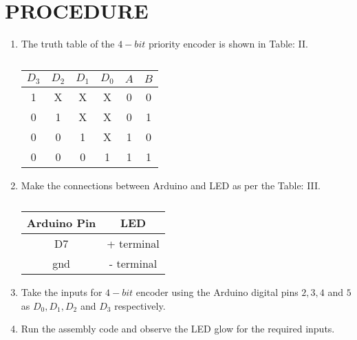 \documentclass[conference]{IEEEtran}
\begin{document}
\section{PROCEDURE}
\begin {enumerate}
\item The truth table of the $4-bit$ priority encoder is shown in Table: II.
\begin{table}[htbp]                                       
\centering                                                          
\begin{tabular}{| c | c | c | c | c | c |} \hline                                
$D_3$ & $D_2$ & $D_1$ & $D_0$ & $A$ & $B$ \\ \hline 
	1 & X & X & X & 0 & 0 \\ \hline                                   
	0 &  1 & X & X & 0 & 1 \\ \hline                                               
	0 & 0 & 1 & X & 1 & 0 \\ \hline                                           
	0 & 0 & 0 & 1  & 1 & 1  \\ \hline                                        
\end{tabular}                                                       
\vspace{0.1cm}                                                      
\caption{\label{tab:widgets}}                                       
\end{table}
\item Make the connections between Arduino and LED as per the Table: III.
 \begin{table}[htbp]                                       
\centering                                                          
\begin{tabular}{| c | c |} \hline                                
	\textbf{Arduino Pin} & \textbf{LED}  \\\hline 
D7 & + terminal  \\ \hline                                       
gnd  & - terminal \\                                               
\hline                                                              
\end{tabular}                                                       
\vspace{0.1cm}                                                      
\caption{\label{tab:widgets}}                                       
\end{table}

\item Take the inputs for $4-bit$ encoder using the Arduino digital pins $2, 3, 4$ and $5$ as $D_0, D_1, D_2$ and $D_3$ respectively.


\item Run the assembly code and observe the LED glow for the required inputs.

	\end {enumerate}
\end{document}
